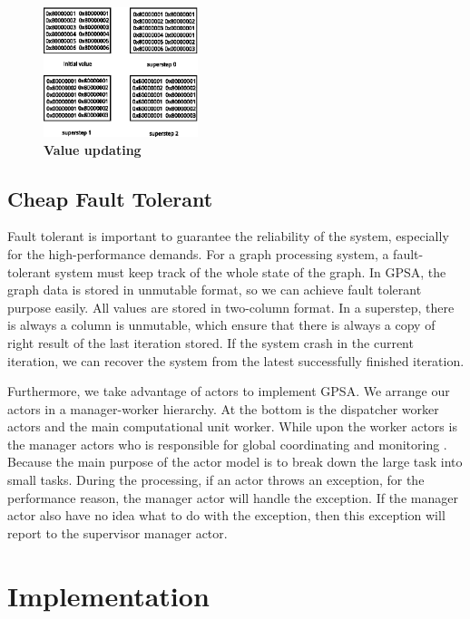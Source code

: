\documentclass[twocolumn,a4paper,10pt]{article}
\begin{document}
\begin{figure}[!htbp] 
\centering
 \begin{minipage}[]{1.2\textwidth}
     \includegraphics[width=0.4\textwidth,angle=0]{figure/Valueupdating.eps}
\end{minipage}
    \caption{\textbf{Value updating}}
    \label{figure:vu}
\end{figure}


\subsection{Cheap Fault Tolerant}
Fault tolerant is important to guarantee the reliability of the system, especially for the high-performance demands. For a graph processing system, a fault-tolerant system must keep track of the whole state of the graph. In GPSA, the graph data is stored in unmutable format, so we can achieve fault tolerant purpose easily. All values are stored  in two-column format. In a superstep, there is always a column is unmutable, which ensure that there is always a copy of right result of the last iteration stored. If the system crash in the current iteration, we can recover the system from the latest successfully finished iteration.

Furthermore, we take advantage of actors to implement GPSA. We arrange our actors in a manager-worker hierarchy. At the bottom is the dispatcher worker actors and the main computational unit worker. While upon the worker actors is the manager actors who is responsible for global coordinating and monitoring . Because the main purpose of the actor model is to break down the large task into small tasks. During the processing, if an actor throws an exception, for the performance reason, the manager actor will handle the exception. If the manager actor also have no idea what to do with the exception, then this exception will report to the supervisor manager actor. \newline



\section{Implementation}
\end{document}
